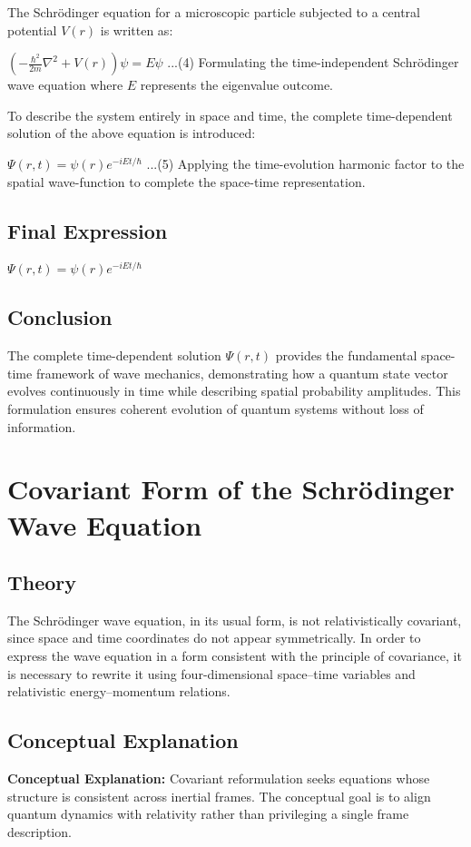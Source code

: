 \documentclass[12pt]{report}
\begin{document}
The Schrödinger equation for a microscopic particle subjected to a central potential $V(r)$ is written as:

$\left( -\frac{\hbar^2}{2m} \nabla^2 + V(r) \right) \psi = E\psi$ ...(4) Formulating the time-independent Schrödinger wave equation where $E$ represents the eigenvalue outcome.

To describe the system entirely in space and time, the complete time-dependent solution of the above equation is introduced:

$\Psi(r, t) = \psi(r) e^{-iEt/\hbar}$ ...(5) Applying the time-evolution harmonic factor to the spatial wave-function to complete the space-time representation.

\subsection*{Final  Expression}

$\Psi(r, t) = \psi(r) e^{-i E t / \hbar}$

\subsection*{Conclusion}

The complete time-dependent solution $\Psi(r, t)$ provides the fundamental space-time framework of wave mechanics, demonstrating how a quantum state vector evolves continuously in time while describing spatial probability amplitudes. This formulation ensures coherent evolution of quantum systems without loss of information.

\section{Covariant Form of the Schrödinger Wave Equation}



\subsection*{Theory}

The Schrödinger wave equation, in its usual form, is not relativistically covariant, since space and time coordinates do not appear symmetrically. In order to express the wave equation in a form consistent with the principle of covariance, it is necessary to rewrite it using four-dimensional space--time variables and relativistic energy--momentum relations.


\subsection{Conceptual Explanation}
\textbf{Conceptual Explanation:} Covariant reformulation seeks equations whose structure is consistent across inertial frames. The conceptual goal is to align quantum dynamics with relativity rather than privileging a single frame description.
\end{document}
